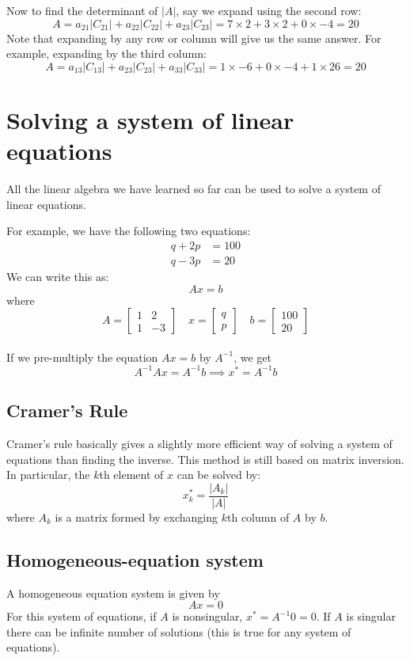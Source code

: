 \documentclass{./../Latex/handout}
\begin{document}
Now to find the determinant of $|A|$, say we expand using the second row:
$$A= a_{21} |C_{21}| + a_{22} |C_{22}| + a_{23} |C_{23}|  = 7\times 2 + 3 \times 2 + 0 \times -4 = 20$$
Note that expanding by any row or column will give us the same answer. For example, expanding by the third column:
$$A= a_{13} |C_{13}| + a_{23} |C_{23}| + a_{33} |C_{33}|  = 1\times -6 + 0 \times -4 + 1 \times 26 = 20$$


\section{Solving a system of linear equations}

All the linear algebra we have learned so far can be used to solve a system of linear equations. 

For example, we have the following two equations:
\begin{align*}
q + 2p &= 100 \\ q-3p &= 20
\end{align*}
We can write this as:
$$ Ax = b $$
where
$$A = \begin{bmatrix}
1 & 2 \\
1 & -3 
\end{bmatrix} \quad 
x = \begin{bmatrix}
q \\
p 
\end{bmatrix} \quad 
b = \begin{bmatrix}
100 \\
20 
\end{bmatrix}$$ \\
If we pre-multiply the equation $Ax=b$ by $A^{-1}$, we get
$$ A^{-1}Ax=A^{-1}b  \implies x^* = A^{-1}b $$ 

\subsection{Cramer's Rule}

Cramer's rule basically gives a slightly more efficient way of solving a system of equations than finding the inverse. This method is still based on matrix inversion. In particular, the $k$th element of $x$ can be solved by:
$$ x^*_k = \frac{|A_k|}{|A|} $$
where $A_k$ is a matrix formed by exchanging $k$th column of $A$ by $b$.

\subsection{Homogeneous-equation system}

A homogeneous equation system is given by 
$$ Ax = 0$$
For this system of equations, if $A$ is nonsingular, $x^* = A^{-1} 0 = 0$. If $A$ is singular there can be infinite number of solutions (this is true for any system of equations).
\end{document}
